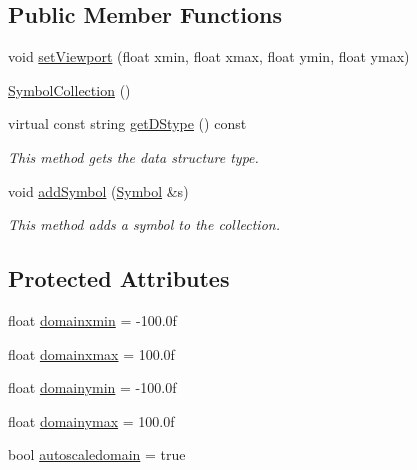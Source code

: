 \subsection*{Public Member Functions}
\begin{DoxyCompactItemize}
\item 
void \hyperlink{classbridges_1_1datastructure_1_1_symbol_collection_a8853f758e4e8ab7f9cef5bf4d0494027}{set\+Viewport} (float xmin, float xmax, float ymin, float ymax)
\item 
\hyperlink{classbridges_1_1datastructure_1_1_symbol_collection_aa8d074ecf235848f4253b19d6f5c7c74}{Symbol\+Collection} ()
\item 
virtual const string \hyperlink{classbridges_1_1datastructure_1_1_symbol_collection_a8f63c31a48a12127978967b706fc38f5}{get\+D\+Stype} () const
\begin{DoxyCompactList}\small\item\em This method gets the data structure type. \end{DoxyCompactList}\item 
void \hyperlink{classbridges_1_1datastructure_1_1_symbol_collection_a14652e01cc99fc470f1fbea30d851a4f}{add\+Symbol} (\hyperlink{classbridges_1_1datastructure_1_1_symbol}{Symbol} \&s)
\begin{DoxyCompactList}\small\item\em This method adds a symbol to the collection. \end{DoxyCompactList}\end{DoxyCompactItemize}
\subsection*{Protected Attributes}
\begin{DoxyCompactItemize}
\item 
float \hyperlink{classbridges_1_1datastructure_1_1_symbol_collection_a3db2f9c5d239e4ca964ea017a2beedac}{domainxmin} = -\/100.\+0f
\item 
float \hyperlink{classbridges_1_1datastructure_1_1_symbol_collection_a424f539a0a7cc48735f58978bb37249b}{domainxmax} = 100.\+0f
\item 
float \hyperlink{classbridges_1_1datastructure_1_1_symbol_collection_a2f08353c46444762f329bec94f087a2b}{domainymin} = -\/100.\+0f
\item 
float \hyperlink{classbridges_1_1datastructure_1_1_symbol_collection_a62b61a0ec9546c68f31a324ff6e6b518}{domainymax} = 100.\+0f
\item 
bool \hyperlink{classbridges_1_1datastructure_1_1_symbol_collection_a27dc0406085568b06244bcc0f8957f68}{autoscaledomain} = true
\end{DoxyCompactItemize}


